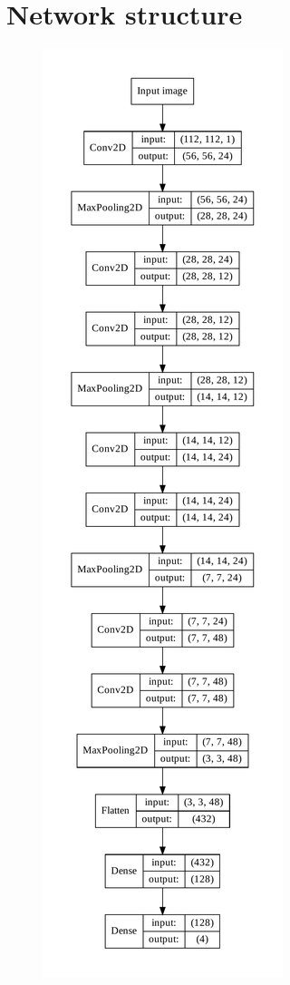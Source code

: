 \documentclass{kththesis}
\begin{document}
\section{Network structure}
\begingroup
\setlength{\columnsep}{0pt}%
\setlength\intextsep{0mm}
\begin{figure}
  \hspace*{-30mm}
  \includegraphics[width=1.7\linewidth]{img/model.pdf}
\end{figure}
\end{document}
